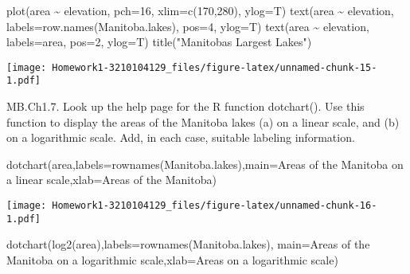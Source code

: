 \documentclass[
]{article}
\newenvironment{Shaded}{\begin{snugshade}}{\end{snugshade}}
\newcommand{\AttributeTok}[1]{\textcolor[rgb]{0.77,0.63,0.00}{#1}}
\newcommand{\DecValTok}[1]{\textcolor[rgb]{0.00,0.00,0.81}{#1}}
\newcommand{\FunctionTok}[1]{\textcolor[rgb]{0.00,0.00,0.00}{#1}}
\newcommand{\NormalTok}[1]{#1}
\newcommand{\SpecialCharTok}[1]{\textcolor[rgb]{0.00,0.00,0.00}{#1}}
\newcommand{\StringTok}[1]{\textcolor[rgb]{0.31,0.60,0.02}{#1}}
\begin{document}
\begin{Shaded}
\begin{Highlighting}[]
\FunctionTok{plot}\NormalTok{(area }\SpecialCharTok{\textasciitilde{}}\NormalTok{ elevation, }\AttributeTok{pch=}\DecValTok{16}\NormalTok{, }\AttributeTok{xlim=}\FunctionTok{c}\NormalTok{(}\DecValTok{170}\NormalTok{,}\DecValTok{280}\NormalTok{), }\AttributeTok{ylog=}\NormalTok{T)}
\FunctionTok{text}\NormalTok{(area }\SpecialCharTok{\textasciitilde{}}\NormalTok{ elevation, }\AttributeTok{labels=}\FunctionTok{row.names}\NormalTok{(Manitoba.lakes), }\AttributeTok{pos=}\DecValTok{4}\NormalTok{, }\AttributeTok{ylog=}\NormalTok{T)}
\FunctionTok{text}\NormalTok{(area }\SpecialCharTok{\textasciitilde{}}\NormalTok{ elevation, }\AttributeTok{labels=}\NormalTok{area, }\AttributeTok{pos=}\DecValTok{2}\NormalTok{, }\AttributeTok{ylog=}\NormalTok{T)}
\FunctionTok{title}\NormalTok{(}\StringTok{"Manitoba\textquotesingle{}s Largest Lakes"}\NormalTok{)}
\end{Highlighting}
\end{Shaded}

\texttt{[image: Homework1-3210104129\_files/figure-latex/unnamed-chunk-15-1.pdf]}

MB.Ch1.7. Look up the help page for the R function dotchart(). Use this
function to display the areas of the Manitoba lakes (a) on a linear
scale, and (b) on a logarithmic scale. Add, in each case, suitable
labeling information.

\begin{Shaded}
\begin{Highlighting}[]
\FunctionTok{dotchart}\NormalTok{(area,}\AttributeTok{labels=}\FunctionTok{rownames}\NormalTok{(Manitoba.lakes),}\AttributeTok{main=}\StringTok{\textquotesingle{}Areas of the Manitoba on a linear scale\textquotesingle{}}\NormalTok{,}\AttributeTok{xlab=}\StringTok{\textquotesingle{}Areas of the Manitoba\textquotesingle{}}\NormalTok{)}
\end{Highlighting}
\end{Shaded}

\texttt{[image: Homework1-3210104129\_files/figure-latex/unnamed-chunk-16-1.pdf]}

\begin{Shaded}
\begin{Highlighting}[]
\FunctionTok{dotchart}\NormalTok{(}\FunctionTok{log2}\NormalTok{(area),}\AttributeTok{labels=}\FunctionTok{rownames}\NormalTok{(Manitoba.lakes), }\AttributeTok{main=}\StringTok{\textquotesingle{}Areas of the Manitoba on a logarithmic scale\textquotesingle{}}\NormalTok{,}\AttributeTok{xlab=}\StringTok{\textquotesingle{}Areas on a logarithmic scale\textquotesingle{}}\NormalTok{)}
\end{Highlighting}
\end{Shaded}
\end{document}
